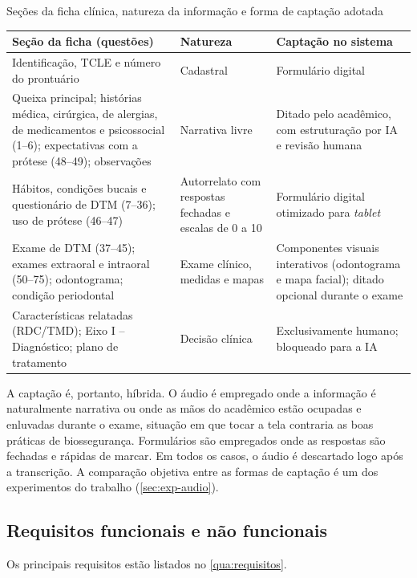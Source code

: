 \begin{quadro}[htbp]
	\caption{Seções da ficha clínica, natureza da informação e forma de captação adotada}
	\label{qua:ficha-captacao}
	\footnotesize
	\begin{tabularx}{\textwidth}{|L{4.3cm}|L{3cm}|Y|}
		\hline
		\textbf{Seção da ficha (questões)} & \textbf{Natureza} & \textbf{Captação no sistema} \\ \hline
		Identificação, TCLE e número do prontuário & Cadastral & Formulário digital \\ \hline
		Queixa principal; histórias médica, cirúrgica, de alergias, de medicamentos e psicossocial (1--6); expectativas com a prótese (48--49); observações & Narrativa livre & Ditado pelo acadêmico, com estruturação por IA e revisão humana \\ \hline
		Hábitos, condições bucais e questionário de DTM (7--36); uso de prótese (46--47) & Autorrelato com respostas fechadas e escalas de 0 a 10 & Formulário digital otimizado para \textit{tablet} \\ \hline
		Exame de DTM (37--45); exames extraoral e intraoral (50--75); odontograma; condição periodontal & Exame clínico, medidas e mapas & Componentes visuais interativos (odontograma e mapa facial); ditado opcional durante o exame \\ \hline
		Características relatadas (RDC/TMD); Eixo I -- Diagnóstico; plano de tratamento & Decisão clínica & Exclusivamente humano; bloqueado para a IA \\ \hline
	\end{tabularx}
\end{quadro}

A captação é, portanto, híbrida. O áudio é empregado onde a informação é naturalmente narrativa ou onde as mãos do acadêmico estão ocupadas e enluvadas durante o exame, situação em que tocar a tela contraria as boas práticas de biossegurança. Formulários são empregados onde as respostas são fechadas e rápidas de marcar. Em todos os casos, o áudio é descartado logo após a transcrição. A comparação objetiva entre as formas de captação é um dos experimentos do trabalho (\autoref{sec:exp-audio}).

\subsection{Requisitos funcionais e não funcionais}

Os principais requisitos estão listados no \autoref{qua:requisitos}.

